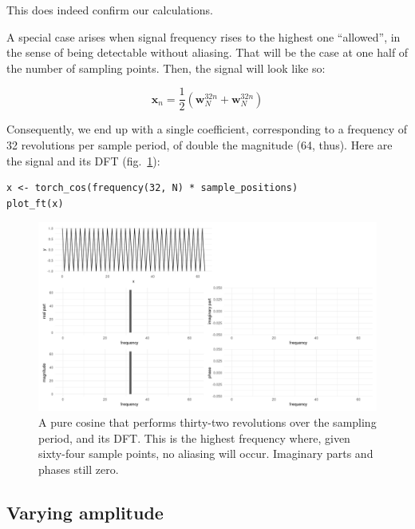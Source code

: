 \documentclass[
  letterpaper,
]{krantz}
\begin{document}
This does indeed confirm our calculations.

A special case arises when signal frequency rises to the highest one
``allowed'', in the sense of being detectable without aliasing. That
will be the case at one half of the number of sampling points. Then, the
signal will look like so:

\[
\mathbf{x}_n = \frac{1}{2} (\mathbf{w}^{32n}_N + \mathbf{w}^{32n}_N)
\]

Consequently, we end up with a single coefficient, corresponding to a
frequency of 32 revolutions per sample period, of double the magnitude
(64, thus). Here are the signal and its DFT
(fig.~\ref{fig-dft-cos-32-rev.png}):

\begin{verbatim}
x <- torch_cos(frequency(32, N) * sample_positions)
plot_ft(x)
\end{verbatim}

\begin{figure}[H]

{\centering \includegraphics{images/dft-cos-32-rev.png}

}

\caption{\label{fig-dft-cos-32-rev.png}A pure cosine that performs
thirty-two revolutions over the sampling period, and its DFT. This is
the highest frequency where, given sixty-four sample points, no aliasing
will occur. Imaginary parts and phases still zero.}

\end{figure}

\hypertarget{varying-amplitude}{%
\subsection{\texorpdfstring{Varying
amplitude}{Varying amplitude}}\label{varying-amplitude}}
\end{document}
